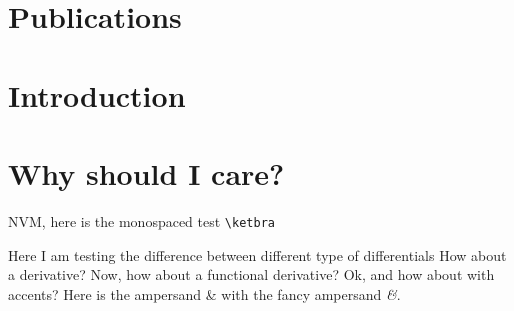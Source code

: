 \documentclass[titlepage,twoside,letterpaper,openright,12pt]{book} %
\begin{document}



{
\setlength{\parskip}{0ex}
\tableofcontents
\listoftables
\listoffigures
}

% 


\chapter{Publications}


\mainmatter

\chapter*{Introduction}




\chapter{Why should I care?}

NVM, here is the monospaced test \texttt{\backslash ketbra}

Here I am testing the difference between different type of differentials
How about a derivative?
Now, how about a functional derivative?
Ok, and how about with accents?
Here is the ampersand \& with the fancy ampersand \textit{\&}.
\end{document}
